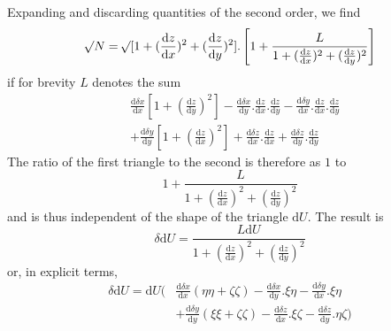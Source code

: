 Expanding and discarding quantities of the second order, we find
\[
\mathord{{}^{}\!\surd}N=\mathord{{}^{}\!\surd}[1+(\frac{\mathrm{d}z}{\mathrm{d}x})^2+(\frac{\mathrm{d}z}{\mathrm{d}y})^2].\left[1+\frac{L}{1+(\frac{\mathrm{d}z}{\mathrm{d}x})^2+(\frac{\mathrm{d}z}{\mathrm{d}y})^2}\right]
\]
if for brevity $L$ denotes the sum
\[
\begin{aligned}
&\frac{\mathrm{d}\delta x}{\mathrm{d}x}[1+(\frac{\mathrm{d}z}{\mathrm{d}y})^2]-\frac{\mathrm{d}\delta x}{\mathrm{d}y}.\frac{\mathrm{d}z}{\mathrm{d}x}.\frac{\mathrm{d}z}{\mathrm{d}y}-\frac{\mathrm{d}\delta y}{\mathrm{d}x}.\frac{\mathrm{d}z}{\mathrm{d}x}.\frac{\mathrm{d}z}{\mathrm{d}y}\\
&+\frac{\mathrm{d}\delta y}{\mathrm{d}y}[1+(\frac{\mathrm{d}z}{\mathrm{d}x})^2]+\frac{\mathrm{d}\delta z}{\mathrm{d}x}.\frac{\mathrm{d}z}{\mathrm{d}x}+\frac{\mathrm{d}\delta z}{\mathrm{d}y}.\frac{\mathrm{d}z}{\mathrm{d}y}
\end{aligned}
\]
The ratio of the first triangle to the second is therefore as $1$ to
\[
1+\frac{L}{1+(\frac{\mathrm{d}z}{\mathrm{d}x})^2+(\frac{\mathrm{d}z}{\mathrm{d}y})^2}
\]
and is thus independent of the shape of the triangle $\mathrm{d}U$. The result is
\[
\delta\mathrm{d}U=\frac{L\mathrm{d}U}{1+(\frac{\mathrm{d}z}{\mathrm{d}x})^2+(\frac{\mathrm{d}z}{\mathrm{d}y})^2}
\]
or, in explicit terms,
\[
\begin{aligned}
\delta\mathrm{d}U=\mathrm{d}U\big(&\frac{\mathrm{d}\delta x}{\mathrm{d}x}(\eta\eta+\zeta\zeta)-\frac{\mathrm{d}\delta x}{\mathrm{d}y}.\xi\eta-\frac{\mathrm{d}\delta y}{\mathrm{d}x}.\xi\eta\\
&+\frac{\mathrm{d}\delta y}{\mathrm{d}y}(\xi\xi+\zeta\zeta)-\frac{\mathrm{d}\delta z}{\mathrm{d}x}.\xi\zeta-\frac{\mathrm{d}\delta z}{\mathrm{d}y}.\eta\zeta\big)
\end{aligned}
\]

